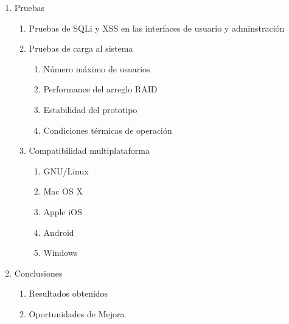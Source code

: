 {\begin{enumerate}
\begin{enumerate}
    \item Hardening
    \begin{enumerate}
      \item Sistema operativo
      \item Servicios
      \begin{enumerate}
        \item ssh
        \item http
        \item ldap
      \end{enumerate}
    \end{enumerate}
  \end{enumerate}
  \item Pruebas
  \begin{enumerate}
    \item Pruebas de SQLi y XSS en las interfaces de usuario y adminstraci\'{o}n
    \item Pruebas de carga al sistema
    \begin{enumerate}
      \item N\'{u}mero m\'{a}ximo de usuarios
      \item Performance del arreglo RAID
      \item Estabilidad del prototipo
      \item Condiciones t\'{e}rmicas de operaci\'{o}n
    \end{enumerate}
    \item Compatibilidad multiplataforma
    \begin{enumerate}
      \item GNU/Linux
      \item Mac OS X
      \item Apple iOS
      \item Android
      \item Windows
    \end{enumerate}
  \end{enumerate}
  \item Conclusiones
  \begin{enumerate}
    \item Resultados obtenidos
    \item Oportunidades de Mejora
  \end{enumerate}
\end{enumerate}
}
